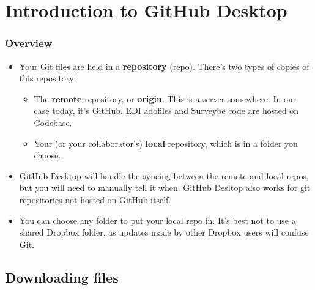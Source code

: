 \documentclass{beamer}
\begin{document}
\section{Introduction to GitHub Desktop}
\begin{frame}
\frametitle{Overview}
	\begin{itemize}
		\item Your Git files are held in a \textbf{repository} (repo). There's two types of copies of this repository:
		\begin{itemize}
			\item The \textbf{remote} repository, or \textbf{origin}. This is a server somewhere. In our case today, it's GitHub. EDI adofiles and Surveybe code are hosted on Codebase.
			\item Your (or your collaborator's) \textbf{local} repository, which is in a folder you choose.
		\end{itemize}
		\item GitHub Desktop will handle the syncing between the remote and local repos, but you will need to manually tell it when. GitHub Desltop also works for git repositories not hosted on GitHub itself.
		\item You can choose any folder to put your local repo in. It's best not to use a shared 
				Dropbox folder, as updates made by other Dropbox users will confuse Git.	
	\end{itemize}
\end{frame}

\subsection{Downloading files}
\end{document}
